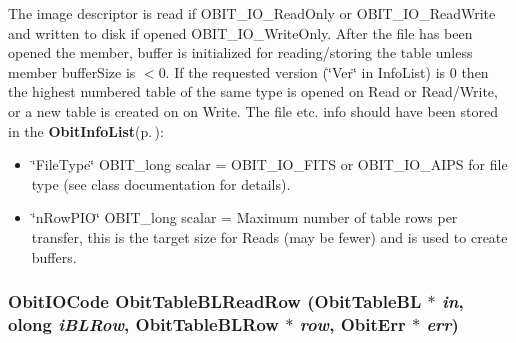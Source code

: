 The image descriptor is read if OBIT\_\-IO\_\-Read\-Only or OBIT\_\-IO\_\-Read\-Write and written to disk if opened OBIT\_\-IO\_\-Write\-Only. After the file has been opened the member, buffer is initialized for reading/storing the table unless member buffer\-Size is $<$0. If the requested version (\char`\"{}Ver\char`\"{} in Info\-List) is 0 then the highest numbered table of the same type is opened on Read or Read/Write, or a new table is created on on Write. The file etc. info should have been stored in the {\bf Obit\-Info\-List}{\rm (p.\,\pageref{structObitInfoList})}: \begin{itemize}
\item \char`\"{}File\-Type\char`\"{} OBIT\_\-long scalar = OBIT\_\-IO\_\-FITS or OBIT\_\-IO\_\-AIPS for file type (see class documentation for details). \item \char`\"{}n\-Row\-PIO\char`\"{} OBIT\_\-long scalar = Maximum number of table rows per transfer, this is the target size for Reads (may be fewer) and is used to create buffers. 
\end{itemize}
\subsubsection{\setlength{\rightskip}{0pt plus 5cm}Obit\-IOCode Obit\-Table\-BLRead\-Row ({\bf Obit\-Table\-BL} $\ast$ {\em in}, {\bf olong} {\em i\-BLRow}, {\bf Obit\-Table\-BLRow} $\ast$ {\em row}, {\bf Obit\-Err} $\ast$ {\em err})}\label{ObitTableBL_8c_a22}


